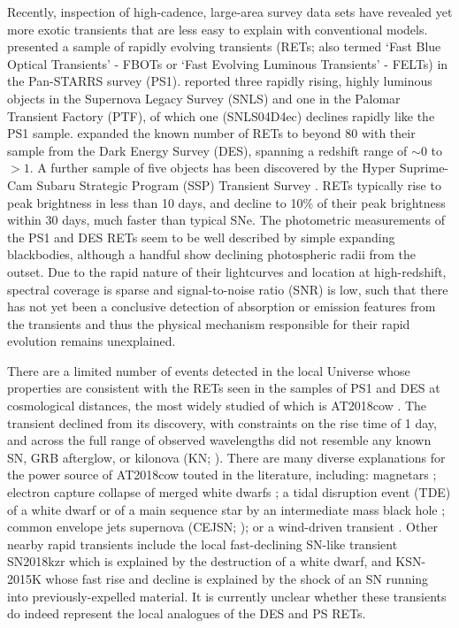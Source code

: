\documentclass[fleqn,usenatbib,]{mnras}
\begin{document}
Recently, inspection of high-cadence, large-area survey data sets have revealed yet more exotic transients that are less easy to explain with conventional models. \citet{Drout2014} presented a sample of rapidly evolving transients (RETs; also termed `Fast Blue Optical Transients' - FBOTs or `Fast Evolving Luminous Transients' - FELTs) in the Pan-STARRS survey (PS1). \citet{Arcavi2016} reported three rapidly rising, highly luminous objects in the Supernova Legacy Survey (SNLS) and one in the Palomar Transient Factory (PTF), of which one (SNLS04D4ec) declines rapidly like the PS1 sample. \citet[hereafter P18]{Pursiainen2018} expanded the known number of RETs to beyond 80 with their sample from the Dark Energy Survey (DES), spanning a redshift range of $\sim 0$ to $>1$. A further sample of five objects has been discovered by the Hyper Suprime-Cam Subaru Strategic Program (SSP) Transient Survey \citep{Tampo2020}. RETs typically rise to peak brightness in less than 10 days, and decline to 10\% of their peak brightness within 30 days, much faster than typical SNe. The photometric measurements of the PS1 and DES RETs seem to be well described by simple expanding blackbodies, although a handful show declining photospheric radii from the outset. Due to the rapid nature of their lightcurves and location at high-redshift, spectral coverage is sparse and signal-to-noise ratio (SNR) is low, such that there has not yet been a conclusive detection of absorption or emission features from the transients and thus the physical mechanism responsible for their rapid evolution remains unexplained.

There are a limited number of events detected in the local Universe whose properties are consistent with the RETs seen in the samples of PS1 and DES at cosmological distances, the most widely studied of which is AT2018cow \citep[e.g.][]{Prentice2018,Margutti2019,Perley2019}. The transient declined from its discovery, with constraints on the rise time of 1 day, and across the full range of observed wavelengths did not resemble any known SN, GRB afterglow, or kilonova (KN; \citealt{Ho2019}). There are many diverse explanations for the power source of AT2018cow touted in the literature, including: magnetars \citep{Mohan2020}; electron capture collapse of merged white dwarfs \citep{Lyutikov2019}; a tidal disruption event (TDE) of a white dwarf \citep{Kuin2019} or of a main sequence star by an intermediate mass black hole \citep{Perley2019}; common envelope jets supernova (CEJSN; \citealt{Soker2019}); or a wind-driven transient \citep{Uno2020}.
Other nearby rapid transients include the local fast-declining SN-like transient SN2018kzr \citep{McBrien2019} which is explained by the destruction of a white dwarf, and KSN-2015K \citep{Rest2018} whose fast rise and decline is explained by the shock of an SN running into previously-expelled material.  It is currently unclear whether these transients do indeed represent the local analogues of the DES and PS RETs.
\end{document}
